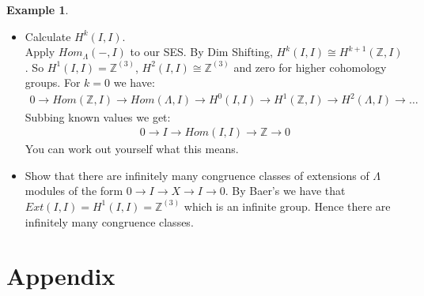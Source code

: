 \documentclass[12pt]{book}
\theoremstyle{definition}
\newtheorem{example}[theorem]{Example}
\begin{document}
\begin{example}
\begin{itemize}
        As $H^2(\mathbb{Z}, \Lambda) = 0$ we have $ H^2(\mathbb{Z}, I) \cong H^1(\mathbb{Z}, \mathbb{Z}) = \mathbb{Z}^{(3)}$. Similarly for $k = 3$: 
        \begin{align*}
            0 \rightarrow \mathbb{Z}^{(3)} \rightarrow H^3(\mathbb{Z}, I) \rightarrow \mathbb{Z} \xrightarrow{\alpha} \mathbb{Z} \rightarrow 0
        \end{align*}
        So as before we get that $H^3(\mathbb{Z}, I) \cong \mathbb{Z}^{(3)}$. Since we have $\mathcal{E}$ as a projective resolution for $\mathbb{Z}$, the projective dimension must be at most 3. Hence the cohomological dimension must be at most 3, meaning that for $k \geq 3$, $H^{k+1}(\mathbb{Z}, I) = 0$. So we don't get any higher cohomology.   
        \item Calculate $H^k(I, I)$. \\
        Apply $Hom_\Lambda(-, I)$ to our SES. By Dim Shifting, $H^k(I, I) \cong H^{k+1}(\mathbb{Z}, I)$. So $H^1(I, I) = \mathbb{Z}^{(3)}$, $H^2(I, I) \cong \mathbb{Z}^(3)$ and zero for higher cohomology groups. For $k = 0$ we have: 
        \begin{align*}
            0 \rightarrow Hom(\mathbb{Z},I) \rightarrow Hom(\Lambda, I) \rightarrow H^0(I, I) \rightarrow H^1(\mathbb{Z}, I) \rightarrow H^2(\Lambda, I) \rightarrow \dots 
        \end{align*}
        Subbing known values we get: 
        \begin{align*}
            0 \rightarrow I \rightarrow Hom(I, I) \rightarrow \mathbb{Z} \rightarrow 0
        \end{align*}
        You can work out yourself what this means. 
        \item Show that there are infinitely many congruence classes of extensions of $\Lambda$ modules of the form $0 \rightarrow I \rightarrow X \rightarrow I \rightarrow 0$. By Baer's we have that $Ext(I, I) = H^1(I, I) = \mathbb{Z}^{(3)}$ which is an infinite group. Hence there are infinitely many congruence classes. 
    \end{itemize}


\end{example}
\chapter{Appendix}
\end{document}
